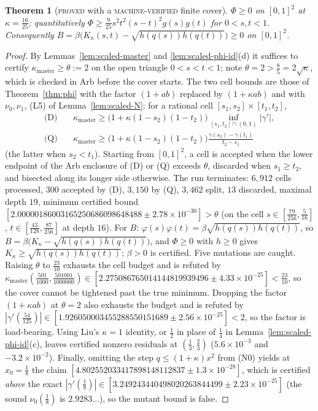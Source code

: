 \documentclass[11pt]{article}
\theoremstyle{plain}
\newtheorem{theorem}{Theorem}[section]
\theoremstyle{definition}
\theoremstyle{remark}
\newcommand{\lbl}[1]{\textsc{#1}}
\begin{document}
\begin{theorem}[\lbl{proved} with a \lbl{machine-verified} finite cover]\label{thm:scaled-phi}
$\Phi\ge0$ on $[0,1]^2$ at $\kappa=\tfrac{16}{25}$; quantitatively
$\Phi\ge\tfrac9{25}s^2t^2(s-t)^2g(s)g(t)$ for $0<s,t<1$.  Consequently
$B=\beta\bigl(K_\kappa(s,t)-\sqrt{h(q(s))h(q(t))}\bigr)\ge0$ on $[0,1]^2$.
\end{theorem}
\begin{proof}
By Lemmas~\ref{lem:scaled-master} and \ref{lem:scaled-phi-id}(d) it suffices
to certify $\kappa_{\mathrm{master}}\ge\theta:=2$ on the open triangle $0<s<t<1$; note
$\theta=2>\tfrac85=2\sqrt\kappa$, which is checked in Arb before the cover
starts.  The two cell bounds are those of Theorem~\ref{thm:phi} with the
factor $(1+ab)$ replaced by $(1+\kappa ab)$ and with $\nu_0,\nu_1$, (L5) of
Lemma~\ref{lem:scaled-N}: for a rational cell
$[s_1,s_2]\times[t_1,t_2]$,
\begin{align*}
  \text{(D)}\quad&\kappa_{\mathrm{master}}\ge\bigl(1+\kappa(1-s_2)(1-t_2)\bigr)\inf_{[s_1,t_2]\cap(0,1)}|\gamma'|,\\
  \text{(Q)}\quad&\kappa_{\mathrm{master}}\ge\bigl(1+\kappa(1-s_2)(1-t_2)\bigr)\frac{\gamma(s_2)-\gamma(t_1)}{t_2-s_1}
\end{align*}
(the latter when $s_2<t_1$).  Starting from $[0,1]^2$, a cell is accepted when
the lower endpoint of the Arb enclosure of (D) or (Q) exceeds $\theta$,
discarded when $s_1\ge t_2$, and bisected along its longer side otherwise.
The run terminates: $6{,}912$ cells processed, $300$ accepted by (D), $3{,}150$
by (Q), $3{,}462$ split, $13$ discarded, maximal depth $19$, minimum certified
bound $[2.00000186003165250686098648488\pm2.78\times10^{-30}]>\theta$ (on the
cell $s\in[\tfrac{79}{256},\tfrac5{16}]$, $t\in[\tfrac{43}{128},\tfrac{87}{256}]$
at depth $16$).  For $B$: $\varphi(s)\varphi(t)=\beta\sqrt{h(q(s))h(q(t))}$, so
$B=\beta\bigl(K_\kappa-\sqrt{h(q(s))h(q(t))}\bigr)$, and $\Phi\ge0$ with
$h\ge0$ gives $K_\kappa\ge\sqrt{h(q(s))h(q(t))}$; $\beta>0$ is certified.
Five mutations are caught.  Raising $\theta$ to $\tfrac{23}{10}$ exhausts the
cell budget and is refuted by
$\kappa_{\mathrm{master}}(\tfrac{501}{1000},\tfrac{501001}{1000000})\in[2.275086765014144819939496\pm4.33\times10^{-25}]<\tfrac{23}{10}$,
so the cover cannot be tightened past the true minimum.  Dropping the factor
$(1+\kappa ab)$ at $\theta=2$ also exhausts the budget and is refuted by
$|\gamma'(\tfrac{54}{125})|\in[1.926050003455288550151689\pm2.56\times10^{-25}]<2$,
so the factor is load-bearing.  Using Liu's $\kappa=1$ identity, or
$\tfrac12$ in place of $\tfrac14$ in
Lemma~\ref{lem:scaled-phi-id}(c), leaves certified nonzero residuals at
$(\tfrac13,\tfrac23)$ ($5.6\times10^{-3}$ and $-3.2\times10^{-2}$).  Finally,
omitting the step $q\le(1+\kappa)x^2$ from (N0) yields at $x_0=\tfrac18$ the
claim $[4.802552033417898148112837\pm1.3\times10^{-28}]$, which is certified
\emph{above} the exact
$|\gamma'(\tfrac18)|\in[3.249243440498020263844499\pm2.23\times10^{-25}]$
(the sound $\nu_0(\tfrac18)$ is $2.9283\ldots$), so the mutant bound is false.
\end{proof}
\end{document}
